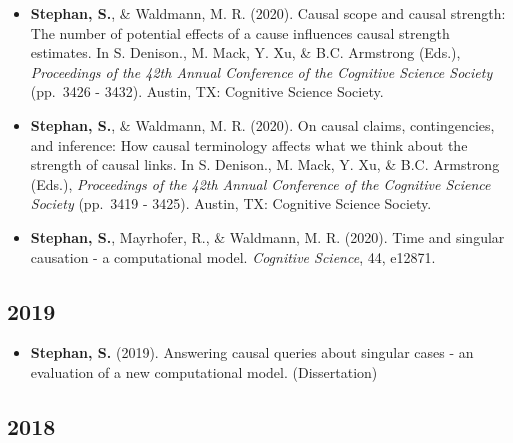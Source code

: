 \documentclass[
]{article}
\providecommand{\tightlist}{%
  \setlength{\itemsep}{0pt}\setlength{\parskip}{0pt}}
\begin{document}
\begin{itemize}
\item
  \textbf{Stephan, S.}, \& Waldmann, M. R. (2020). Causal scope and
  causal strength: The number of potential effects of a cause influences
  causal strength estimates. In S. Denison., M. Mack, Y. Xu, \& B.C.
  Armstrong (Eds.), \emph{Proceedings of the 42th Annual Conference of
  the Cognitive Science Society} (pp.~3426 - 3432). Austin, TX:
  Cognitive Science Society.
  {\href{publications/Stephan-Waldmann-2020-_CausalScopeAndStrength_Proceedings.pdf}{}}
  {\href{https://osf.io/mjswc/}{}}
\item
  \textbf{Stephan, S.}, \& Waldmann, M. R. (2020). On causal claims,
  contingencies, and inference: How causal terminology affects what we
  think about the strength of causal links. In S. Denison., M. Mack, Y.
  Xu, \& B.C. Armstrong (Eds.), \emph{Proceedings of the 42th Annual
  Conference of the Cognitive Science Society} (pp.~3419 - 3425).
  Austin, TX: Cognitive Science Society.
  {\href{publications/Stephan-Waldmann-2020-_CausalClaimsAndInference_Proceedings.pdf}{}}
  {\href{https://osf.io/5ngpd/}{}}
\item
  \textbf{Stephan, S.}, Mayrhofer, R., \& Waldmann, M. R. (2020). Time
  and singular causation - a computational model. \emph{Cognitive
  Science}, 44, e12871.
  {\href{https://onlinelibrary.wiley.com/doi/epdf/10.1111/cogs.12871}{}}
  {\href{https://osf.io/5yvs4/}{}} {\href{https://osf.io/n93bu}{}}
\end{itemize}

\hypertarget{section-8}{%
\subsection{2019}\label{section-8}}

\begin{itemize}
\tightlist
\item
  \textbf{Stephan, S.} (2019). Answering causal queries about singular
  cases - an evaluation of a new computational model. (Dissertation)
  {\href{publications/dissertation_simon_stephan.pdf}{}}
\end{itemize}

\hypertarget{section-9}{%
\subsection{2018}\label{section-9}}
\end{document}
